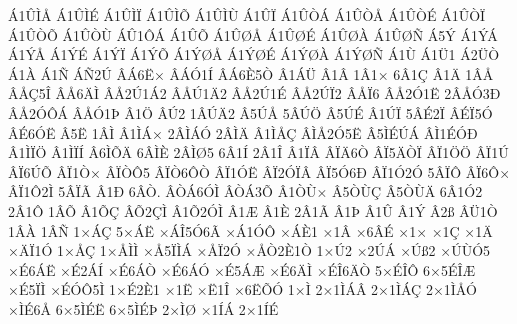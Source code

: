 {^^c11^^db^^cc^^c5
^^c11^^db^^cc^^c9
^^c11^^db^^cc^^cf
^^c11^^db^^cc^^d5
^^c11^^db^^cc^^d9
^^c11^^db^^cf
^^c11^^db^^d2^^c1
^^c11^^db^^d2^^c5
^^c11^^db^^d2^^c9
^^c11^^db^^d2^^cf
^^c11^^db^^d2^^d5
^^c11^^db^^d2^^d9
^^c1^^db1^^d4^^c1
^^c11^^db^^d5
^^c11^^db^^d8^^c5
^^c11^^db^^d8^^c9
^^c11^^db^^d8^^c0
^^c11^^db^^d8^^d1
^^c15^^dd
^^c11^^dd^^c1
^^c11^^dd^^c5
^^c11^^dd^^c9
^^c11^^dd^^cf
^^c11^^dd^^d5
^^c11^^dd^^d8^^c5
^^c11^^dd^^d8^^c9
^^c11^^dd^^d8^^c0
^^c11^^dd^^d8^^d1
^^c11^^d9
^^c11^^dc1
^^c12^^dc^^d2
^^c11^^c0
^^c11^^d1
^^c1^^d12^^da
^^c2^^c16^^cb^^d7
^^c2^^c1^^d31^^cd
^^c2^^c16^^c85^^d2
^^c21^^c1^^dc
^^c21^^c2
1^^c21^^d7
6^^c21^^c7
^^c21^^c4
1^^c2^^c5
^^c2^^c5^^c75^^ce
^^c2^^c56^^c4^^cc
^^c2^^c52^^da1^^c12
^^c2^^c5^^da1^^c42
^^c2^^c52^^da1^^c9
^^c2^^c52^^da^^cf2
^^c2^^c5^^cf6
^^c2^^c52^^d31^^cb
2^^c2^^c5^^d33^^d0
^^c2^^c52^^d3^^d4^^c1
^^c2^^c5^^d31^^de
^^c21^^d6
^^c2^^da2
1^^c2^^da^^c42
^^c25^^da^^c5
5^^c2^^da^^d6
^^c25^^da^^c9
^^c21^^da^^cf
5^^c2^^c92^^cf
^^c2^^c9^^cf5^^d3
^^c2^^c96^^d3^^cb
^^c25^^cb
1^^c2^^cc
^^c21^^cc^^c1^^d7
2^^c2^^cc^^c1^^d3
2^^c2^^cc^^c4
^^c21^^cc^^c5^^c7
^^c2^^cc^^c52^^d35^^cb
^^c25^^cc^^c9^^da^^c1
^^c2^^cc1^^c9^^d3^^d0
^^c21^^cc^^cf^^d6
^^c21^^cc^^cf^^cd
^^c26^^cc^^d5^^c4
6^^c2^^cc^^c8
2^^c2^^cc^^d85
6^^c21^^cd
2^^c21^^ce
^^c21^^cf^^c2
^^c2^^cf^^c46^^d2
^^c2^^cf5^^c4^^d2^^cf
^^c2^^cf1^^d6^^d6
^^c2^^cf1^^da
^^c2^^cf6^^da^^d5
^^c2^^cf1^^d2^^d7
^^c2^^cf^^d2^^d45
^^c2^^cf^^d26^^d4^^d2
^^c2^^cf1^^d3^^cb
^^c2^^cf2^^d3^^cf^^c2
^^c2^^cf5^^d36^^d0
^^c2^^cf1^^d32^^d3
5^^c2^^cf^^d4
^^c2^^cf6^^d4^^d7
^^c2^^cf1^^d42^^cc
5^^c2^^cf^^c3
^^c21^^d0
6^^c2^^d2.
^^c2^^d2^^c16^^d3^^cc
^^c2^^d2^^c13^^d5
^^c21^^d2^^d9^^d7
^^c25^^d2^^d9^^c7
^^c25^^d2^^d9^^c4
6^^c21^^d32
2^^c21^^d4
1^^c2^^d5
^^c21^^d5^^c7
^^c2^^d52^^c7^^cc
^^c21^^d52^^d3^^cc
^^c21^^c6
^^c21^^c8
2^^c21^^c3
^^c21^^de
^^c21^^db
^^c21^^dd
^^c22^^df
^^c2^^dc1^^d2
1^^c2^^c0
1^^c2^^d1
1^^d7^^c1^^c7
5^^d7^^c1^^cb
^^d7^^c1^^ce5^^d36^^c3
^^d7^^c11^^d3^^d4
^^d7^^c1^^c81
^^d71^^c2
^^d76^^c2^^c9
^^d71^^d7
^^d71^^c7
^^d71^^c4
^^d7^^c4^^cf1^^d3
1^^d7^^c5^^c7
1^^d7^^c5^^cc^^cc
^^d7^^c55^^cf^^cc^^c1
^^d7^^c5^^cf2^^d3
^^d7^^c5^^d22^^c81^^d2
1^^d7^^da2
^^d72^^da^^c1
^^d7^^da^^df2
^^d7^^da^^d9^^d35
^^d7^^c96^^c1^^cb
^^d7^^c92^^c1^^cd
^^d7^^c96^^c1^^d2
^^d7^^c96^^c1^^d3
^^d7^^c95^^c1^^c6
^^d7^^c96^^c4^^cc
^^d7^^c9^^ce6^^c4^^d2
5^^d7^^c9^^ce^^d4
6^^d75^^c9^^ce^^c6
^^d7^^c95^^cf^^cc
^^d7^^c9^^d3^^d45^^cc
1^^d7^^c92^^c81
^^d71^^cb
^^d7^^cb1^^ce
^^d76^^cb^^d5^^d3
1^^d7^^cc
2^^d71^^cc^^c1^^c2
2^^d71^^cc^^c1^^c7
2^^d71^^cc^^c5^^d3
^^d7^^cc^^c96^^c5
6^^d75^^cc^^c9^^cb
6^^d75^^cc^^c9^^de
2^^d7^^cc^^d8
^^d71^^cd^^c1
2^^d71^^cd^^c9
}
